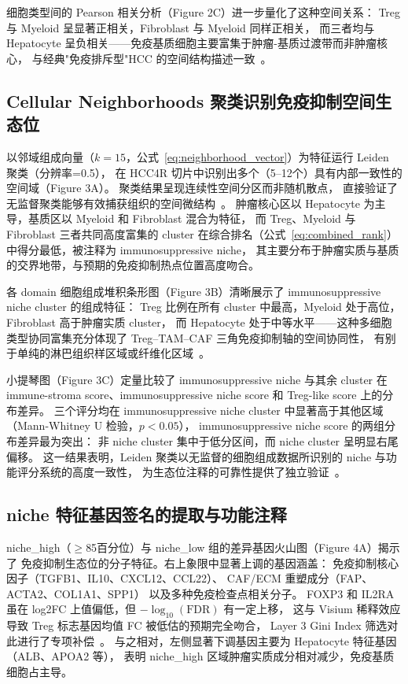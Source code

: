 \documentclass[12pt, a4paper]{ctexart}
\begin{document}
细胞类型间的 Pearson 相关分析（Figure 2C）进一步量化了这种空间关系：
Treg 与 Myeloid 呈显著正相关，Fibroblast 与 Myeloid 同样正相关，
而三者均与 Hepatocyte 呈负相关——免疫基质细胞主要富集于肿瘤-基质过渡带而非肿瘤核心，
与经典"免疫排斥型"HCC 的空间结构描述一致~\citep{llovet2021hepatocellular}。

\subsection{Cellular Neighborhoods 聚类识别免疫抑制空间生态位}

以邻域组成向量（$k=15$，公式~\ref{eq:neighborhood_vector}）为特征运行 Leiden 聚类（分辨率=0.5），
在 HCC4R 切片中识别出多个（5--12个）具有内部一致性的空间域（Figure 3A）。
聚类结果呈现连续性空间分区而非随机散点，
直接验证了无监督聚类能够有效捕获组织的空间微结构~\citep{schurch2020coordinated}。
肿瘤核心区以 Hepatocyte 为主导，基质区以 Myeloid 和 Fibroblast 混合为特征，
而 Treg、Myeloid 与 Fibroblast 三者共同高度富集的 cluster 在综合排名（公式~\ref{eq:combined_rank}）
中得分最低，被注释为 immunosuppressive niche，
其主要分布于肿瘤实质与基质的交界地带，与预期的免疫抑制热点位置高度吻合。

各 domain 细胞组成堆积条形图（Figure 3B）清晰展示了 immunosuppressive niche cluster 的组成特征：
Treg 比例在所有 cluster 中最高，Myeloid 处于高位，Fibroblast 高于肿瘤实质 cluster，
而 Hepatocyte 处于中等水平——这种多细胞类型协同富集充分体现了 Treg--TAM--CAF 三角免疫抑制轴的空间协同性，
有别于单纯的淋巴组织样区域或纤维化区域~\citep{schurch2020coordinated,sakaguchi2020regulatory}。

小提琴图（Figure 3C）定量比较了 immunosuppressive niche 与其余 cluster 在
immune-stroma score、immunosuppressive niche score 和 Treg-like score 上的分布差异。
三个评分均在 immunosuppressive niche cluster 中显著高于其他区域（Mann-Whitney U 检验，$p < 0.05$），
immunosuppressive niche score 的两组分布差异最为突出：
非 niche cluster 集中于低分区间，而 niche cluster 呈明显右尾偏移。
这一结果表明，Leiden 聚类以无监督的细胞组成数据所识别的 niche 与功能评分系统的高度一致性，
为生态位注释的可靠性提供了独立验证~\citep{mann1947test}。

\subsection{niche 特征基因签名的提取与功能注释}

niche\_high（$\geq$85百分位）与 niche\_low 组的差异基因火山图（Figure 4A）揭示了
免疫抑制生态位的分子特征。右上象限中显著上调的基因涵盖：
免疫抑制核心因子（TGFB1、IL10、CXCL12、CCL22）、
CAF/ECM 重塑成分（FAP、ACTA2、COL1A1、SPP1）
以及多种免疫检查点相关分子。
FOXP3 和 IL2RA 虽在 log2FC 上值偏低，但 $-\log_{10}(\text{FDR})$ 有一定上移，
这与 Visium 稀释效应导致 Treg 标志基因均值 FC 被低估的预期完全吻合，
Layer 3 Gini Index 筛选对此进行了专项补偿~\citep{luecken2019current}。
与之相对，左侧显著下调基因主要为 Hepatocyte 特征基因（ALB、APOA2 等），
表明 niche\_high 区域肿瘤实质成分相对减少，免疫基质细胞占主导。
\end{document}
